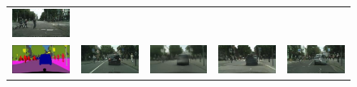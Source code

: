 \begin{figure}[t]
\begin{center}
\begin{tabular}{ccccc}
\includegraphics[width=0.2\linewidth]{figs/cityscapes_loss_variations_latex/L1cGAN_116.jpg} \\ 
\includegraphics[width=0.2\linewidth]{figs/cityscapes_loss_variations_latex/input_382.jpg} &
\includegraphics[width=0.2\linewidth]{figs/cityscapes_loss_variations_latex/gt_382.jpg} &
\includegraphics[width=0.2\linewidth]{figs/cityscapes_loss_variations_latex/L1_382.jpg} &
\includegraphics[width=0.2\linewidth]{figs/cityscapes_loss_variations_latex/cGAN_382.jpg} &
\includegraphics[width=0.2\linewidth]{figs/cityscapes_loss_variations_latex/L1cGAN_382.jpg} \\


\end{tabular}
\end{center}
\end{figure}

